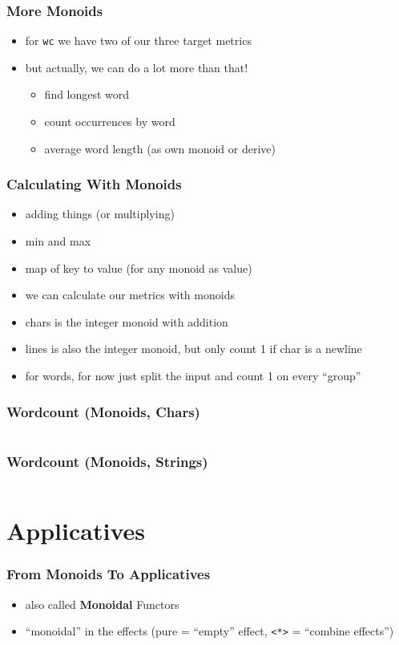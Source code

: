 \documentclass[aspectratio=169]{beamer}
\begin{document}
\begin{frame}
  \frametitle{More Monoids}
  \begin{itemize}
  \item for \texttt{wc} we have two of our three target metrics
  \item but actually, we can do a lot more than that!
    \begin{itemize}
    \item find longest word
    \item count occurrences by word
    \item average word length (as own monoid or derive)
    \end{itemize}
  \end{itemize}
\end{frame}

\begin{frame}
  \frametitle{Calculating With Monoids}
  \begin{itemize}
  \item adding things (or multiplying)
  \item min and max
  \item map of key to value (for any monoid as value)
  \item we can calculate our metrics with monoids
  \item chars is the integer monoid with addition
  \item lines is also the integer monoid, but only count 1 if char is a newline
  \item for words, for now just split the input and count 1 on every ``group''
  \end{itemize}
\end{frame}

\begin{frame}
  \frametitle{Wordcount (Monoids, Chars)}
  \inputminted[fontsize=\footnotesize]{scala}{snippets/wc-monoid-char.scala}
\end{frame}

\begin{frame}
  \frametitle{Wordcount (Monoids, Strings)}
  \inputminted[fontsize=\footnotesize]{scala}{snippets/wc-monoid-string.scala}
\end{frame}

\section{Applicatives}\label{sec:applicatives}

\begin{frame}
  \frametitle{From Monoids To Applicatives}
  \begin{itemize}
  \item also called \textbf{Monoidal} Functors
  \item ``monoidal'' in the effects (pure = ``empty'' effect, \texttt{<*>} = ``combine effects'')
  \end{itemize}
\end{frame}
\end{document}

